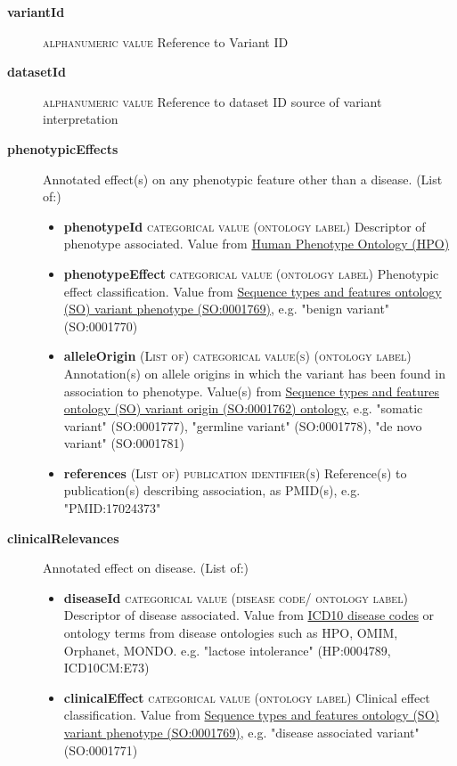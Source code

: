 \documentclass[a4paper, 10pt]{article}        %
\begin{document}
  \begin{description}
  	\item[\textbf{variantId}] {\textsc{alphanumeric value}} Reference to Variant ID 		\item[\textbf{datasetId}] {\textsc{alphanumeric value}} Reference to dataset ID source of variant interpretation
	\item[\textbf{phenotypicEffects}] Annotated effect(s) on any phenotypic feature other than a disease. (List of:)
	\begin{itemize}
				\item[] \textbf{phenotypeId} {\textsc{categorical value (ontology label)}} Descriptor of phenotype associated. Value from \href{http:purl.obolibrary.org/obo/HP_0000001}{Human Phenotype Ontology (HPO)}
				\item[] \textbf{phenotypeEffect} {\textsc{categorical value (ontology label)}} Phenotypic effect classification. Value from \href{http://purl/obolibrary.org/obo/SO_0001769}{Sequence types and features ontology (SO) variant phenotype (SO:0001769)}, e.g. "benign variant" (SO:0001770)
				\item[] \textbf{alleleOrigin} {\textsc{(List of) categorical value(s) (ontology label)}} Annotation(s) on allele origins in which the variant has been found in association to phenotype. Value(s) from \href{http://purl.obolibrary.org/obo/SO_0001762}{Sequence types and features ontology (SO) variant origin (SO:0001762) ontology}, e.g. "somatic variant" (SO:0001777), "germline variant" (SO:0001778), "de novo variant" (SO:0001781)
				\item[] \textbf{references} {\textsc{(List of) publication identifier(s)}} Reference(s) to publication(s) describing association, as PMID(s), e.g. "PMID:17024373"
	\end{itemize} 
	\item[\textbf{clinicalRelevances}] Annotated effect on disease. (List of:)
			\begin{itemize}
				\item[] \textbf{diseaseId} {\textsc{categorical value (disease code/ ontology label)}} Descriptor of disease associated. Value from \href{https://www.who.int/classifications/icd/en/}{ICD10 disease codes} or ontology terms from disease ontologies such as HPO, OMIM, Orphanet, MONDO. e.g. "lactose intolerance" (HP:0004789, ICD10CM:E73)
				\item[] \textbf{clinicalEffect} {\textsc{categorical value (ontology label)}} Clinical effect classification. Value from \href{http://purl/obolibrary.org/obo/SO_0001769}{Sequence types and features ontology (SO) variant phenotype (SO:0001769)}, e.g. "disease associated variant" (SO:0001771)

\end{itemize}
\end{description}
\end{document}
